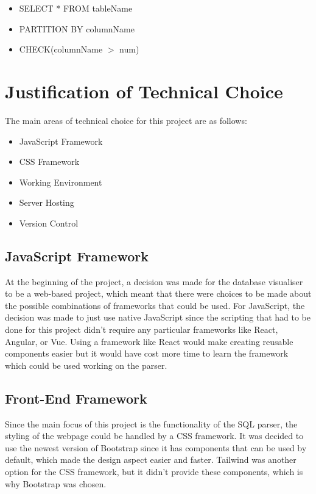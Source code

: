 \begin{itemize}
	\item SELECT * FROM tableName
	\item PARTITION BY columnName
	\item CHECK(columnName $>$ num)
\end{itemize}

\newpage

\section{Justification of Technical Choice}

The main areas of technical choice for this project are as follows:

\begin{itemize}
	\item JavaScript Framework
	\item CSS Framework
	\item Working Environment
	\item Server Hosting
	\item Version Control
\end{itemize}

\subsection{JavaScript Framework}

At the beginning of the project, a decision was made for the database visualiser to be a web-based project, which meant that there were choices to be made about the possible combinations of frameworks that could be used. For JavaScript, the decision was made to just use native JavaScript since the scripting that had to be done for this project didn't require any particular frameworks like React, Angular, or Vue. Using a framework like React would make creating reusable components easier but it would have cost more time to learn the framework which could be used working on the parser. 

\subsection{Front-End Framework}

Since the main focus of this project is the functionality of the SQL parser, the styling of the webpage could be handled by a CSS framework. It was decided to use the newest version of Bootstrap \cite{Bootstrap} since it has components that can be used by default, which made the design aspect easier and faster. Tailwind was another option for the CSS framework, but it didn't provide these components, which is why Bootstrap was chosen.

